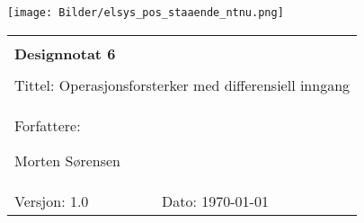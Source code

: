 \topmargin -1.5cm
\begin{minipage}[c]{0.15\textwidth}
\texttt{[image: Bilder/elsys\_pos\_staaende\_ntnu.png]}  
\end{minipage}
\begin{minipage}[c]{0.85\textwidth}

\renewcommand{\arraystretch}{1.7}
\large 
\begin{tabularx}{\textwidth}{|X|X|}
\hline
\multicolumn{2}{|l|}{} \\
\multicolumn{2}{|l|}{\huge \textbf{Designnotat 6}} \\
\multicolumn{2}{|l|}{}  \\
\hline
\multicolumn{2}{|l|}{\parbox[c][1.4cm]{0.9\textwidth}{Tittel: 
Operasjonsforsterker med differensiell inngang

}} \\
\hline
\multicolumn{2}{|l|}{Forfattere: 

Morten Sørensen
} \\
\hline

Versjon: 1.0 & Dato: \today
\\
\hline 
\end{tabularx}
\end{minipage}
\normalsize

